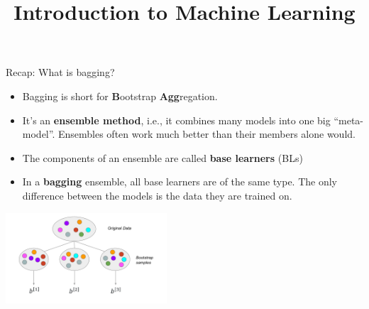 \documentclass[11pt,compress,t,notes=noshow, xcolor=table]{beamer}
\title{Introduction to Machine Learning}
\begin{document}


\begin{vbframe}{Recap: What is bagging?}

\begin{itemize}
  \item Bagging is short for \textbf{B}ootstrap \textbf{Agg}regation.
  \item It's an \textbf{ensemble method}, i.e., it combines many models into one 
        big \enquote{meta-model}. Ensembles often work much better than their members alone would.
  \item The components of an ensemble are called \textbf{base learners} (BLs)
  \item In a \textbf{bagging} ensemble, all base learners are of the same type. The only difference between the models is the data they are trained on.\\
\end{itemize}

\begin{center}
\includegraphics[width=0.45\textwidth]{figure_man/bagging.pdf}
\end{center}


\end{vbframe}
\end{document}
